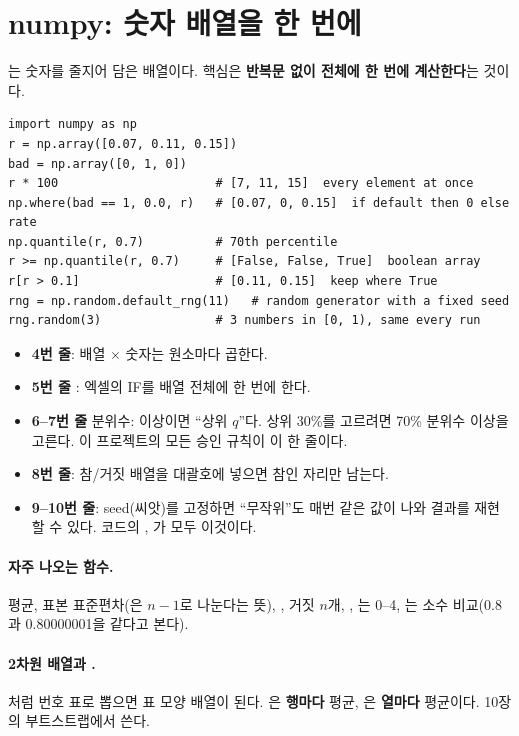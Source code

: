 \section{numpy: 숫자 배열을 한 번에}
는 숫자를 줄지어 담은 배열이다. 핵심은 \textbf{반복문 없이 전체에 한 번에 계산한다}는 것이다.
\begin{lstlisting}
import numpy as np
r = np.array([0.07, 0.11, 0.15])
bad = np.array([0, 1, 0])
r * 100                      # [7, 11, 15]  every element at once
np.where(bad == 1, 0.0, r)   # [0.07, 0, 0.15]  if default then 0 else rate
np.quantile(r, 0.7)          # 70th percentile
r >= np.quantile(r, 0.7)     # [False, False, True]  boolean array
r[r > 0.1]                   # [0.11, 0.15]  keep where True
rng = np.random.default_rng(11)   # random generator with a fixed seed
rng.random(3)                # 3 numbers in [0, 1), same every run
\end{lstlisting}
\begin{itemize}[leftmargin=*]
\item \textbf{4번 줄}: 배열 \ensuremath{\times} 숫자는 원소마다 곱한다.
\item \textbf{5번 줄} : 엑셀의 IF를 배열 전체에 한 번에 한다.
\item \textbf{6--7번 줄} 분위수:  이상이면 ``상위 $q$''다. 상위 30\%를 고르려면 70\% 분위수 이상을 고른다. 이 프로젝트의 모든 승인 규칙이 이 한 줄이다.
\item \textbf{8번 줄}: 참/거짓 배열을 대괄호에 넣으면 참인 자리만 남는다.
\item \textbf{9--10번 줄}: seed(씨앗)를 고정하면 ``무작위''도 매번 같은 값이 나와 결과를 재현할 수 있다. 코드의 , 가 모두 이것이다.
\end{itemize}
\paragraph{자주 나오는 함수.}  평균,  표본 표준편차(은 $n-1$로 나눈다는 뜻), ,  거짓 $n$개, , 는 0--4, 는 소수 비교(0.8과 0.80000001을 같다고 본다).
\paragraph{2차원 배열과 .} 처럼 번호 표로 뽑으면 표 모양 배열이 된다. 은 \textbf{행마다} 평균, 은 \textbf{열마다} 평균이다. 10장의 부트스트랩에서 쓴다.

